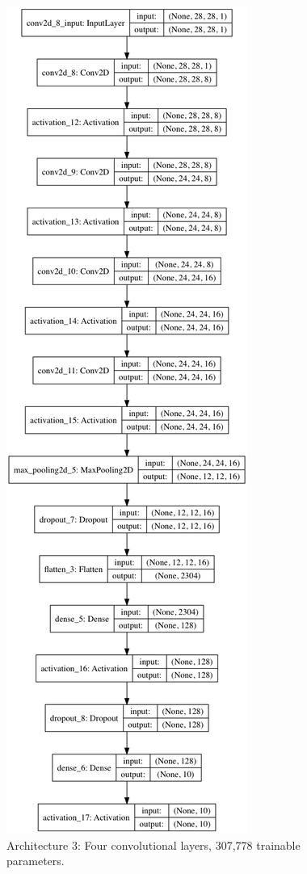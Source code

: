 \documentclass[letterpaper, 10 pt, conference]{ieeeconf}  %
\begin{document}
\begin{figure}
      \centering
      \includegraphics[scale = .3]{model2.png}
		\centering
      \caption{Architecture 3: Four convolutional layers, 307,778 trainable parameters.}
      \label{figurelabel}
   \end{figure}
   
\end{document}
